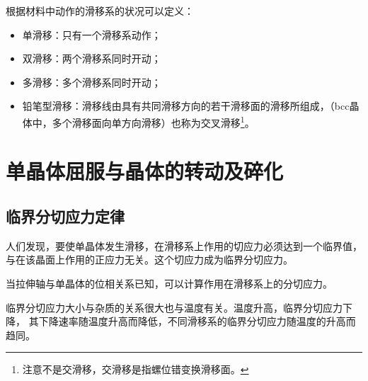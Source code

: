             根据材料中动作的滑移系的状况可以定义：
            \begin{itemize}
                \item 单滑移：只有一个滑移系动作；
                \item 双滑移：两个滑移系同时开动；
                \item 多滑移：多个滑移系同时开动；
                \item 铅笔型滑移：滑移线由具有共同滑移方向的若干滑移面的滑移所组成，（bcc晶体中，多个滑移面向单方向滑移）也称为交叉滑移\footnote{注意不是交滑移，交滑移是指螺位错变换滑移面。}。
            \end{itemize}
    \section{单晶体屈服与晶体的转动及碎化}
        \subsection{临界分切应力定律}
            人们发现，要使单晶体发生滑移，在滑移系上作用的切应力必须达到一个临界值，
            与在该晶面上作用的正应力无关。这个切应力成为临界分切应力。

            当拉伸轴与单晶体的位相关系已知，可以计算作用在滑移系上的分切应力。 
            
            临界分切应力大小与杂质的关系很大也与温度有关。温度升高，临界分切应力下降，
            其下降速率随温度升高而降低，不同滑移系的临界分切应力随温度的升高而趋同。
